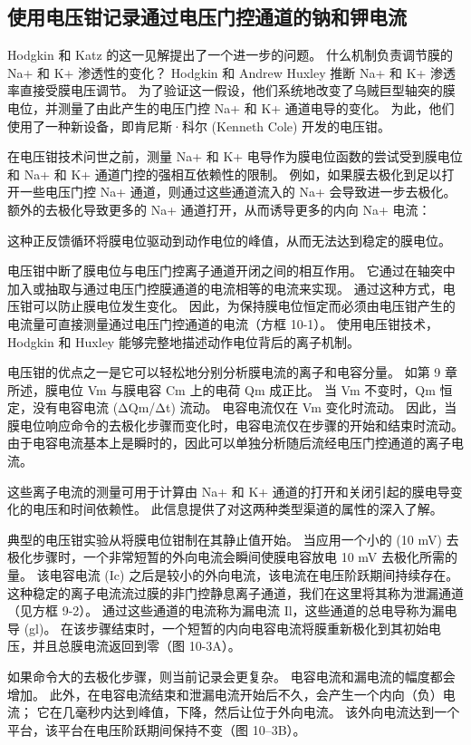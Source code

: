\subsection{使用电压钳记录通过电压门控通道的钠和钾电流}
Hodgkin 和 Katz 的这一见解提出了一个进一步的问题。 
什么机制负责调节膜的 Na+ 和 K+ 渗透性的变化？ 
Hodgkin 和 Andrew Huxley 推断 Na+ 和 K+ 渗透率直接受膜电压调节。 
为了验证这一假设，他们系统地改变了乌贼巨型轴突的膜电位，并测量了由此产生的电压门控 Na+ 和 K+ 通道电导的变化。 
为此，他们使用了一种新设备，即肯尼斯·科尔 (Kenneth Cole) 开发的电压钳。


在电压钳技术问世之前，测量 Na+ 和 K+ 电导作为膜电位函数的尝试受到膜电位和 Na+ 和 K+ 通道门控的强相互依赖性的限制。 
例如，如果膜去极化到足以打开一些电压门控 Na+ 通道，则通过这些通道流入的 Na+ 会导致进一步去极化。 
额外的去极化导致更多的 Na+ 通道打开，从而诱导更多的内向 Na+ 电流：


这种正反馈循环将膜电位驱动到动作电位的峰值，从而无法达到稳定的膜电位。


电压钳中断了膜电位与电压门控离子通道开闭之间的相互作用。 
它通过在轴突中加入或抽取与通过电压门控膜通道的电流相等的电流来实现。 
通过这种方式，电压钳可以防止膜电位发生变化。 
因此，为保持膜电位恒定而必须由电压钳产生的电流量可直接测量通过电压门控通道的电流（方框 10-1）。 
使用电压钳技术，Hodgkin 和 Huxley 能够完整地描述动作电位背后的离子机制。


电压钳的优点之一是它可以轻松地分别分析膜电流的离子和电容分量。 
如第 9 章所述，膜电位 Vm 与膜电容 Cm 上的电荷 Qm 成正比。 
当 Vm 不变时，Qm 恒定，没有电容电流 (ΔQm/Δt) 流动。 
电容电流仅在 Vm 变化时流动。 因此，当膜电位响应命令的去极化步骤而变化时，电容电流仅在步骤的开始和结束时流动。 
由于电容电流基本上是瞬时的，因此可以单独分析随后流经电压门控通道的离子电流。


这些离子电流的测量可用于计算由 Na+ 和 K+ 通道的打开和关闭引起的膜电导变化的电压和时间依赖性。 
此信息提供了对这两种类型渠道的属性的深入了解。


典型的电压钳实验从将膜电位钳制在其静止值开始。 
当应用一个小的 (10 mV) 去极化步骤时，一个非常短暂的外向电流会瞬间使膜电容放电 10 mV 去极化所需的量。 
该电容电流 (Ic) 之后是较小的外向电流，该电流在电压阶跃期间持续存在。 
这种稳定的离子电流流过膜的非门控静息离子通道，我们在这里将其称为泄漏通道（见方框 9-2）。 
通过这些通道的电流称为漏电流 Il，这些通道的总电导称为漏电导 (gl)。 
在该步骤结束时，一个短暂的内向电容电流将膜重新极化到其初始电压，并且总膜电流返回到零（图 10-3A）。


如果命令大的去极化步骤，则当前记录会更复杂。 
电容电流和漏电流的幅度都会增加。 
此外，在电容电流结束和泄漏电流开始后不久，会产生一个内向（负）电流； 它在几毫秒内达到峰值，下降，然后让位于外向电流。 
该外向电流达到一个平台，该平台在电压阶跃期间保持不变（图 10–3B）。


